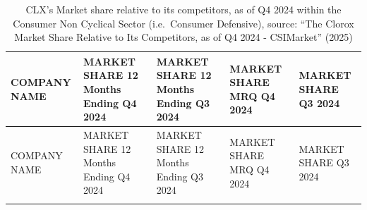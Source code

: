 \documentclass[
  letterpaper,
  DIV=11,
  numbers=noendperiod]{scrartcl}
\begin{document}
\begin{longtable}[]{@{}
  >{\raggedright\arraybackslash}p{}
  >{\raggedright\arraybackslash}p{}
  >{\raggedright\arraybackslash}p{}
  >{\raggedright\arraybackslash}p{}
  >{\raggedright\arraybackslash}p{}@{}}
\caption{CLX's Market share relative to its competitors, as of Q4 2024
within the Consumer Non Cyclical Sector (i.e.~Consumer Defensive),
source: {``The {Clorox Market} Share Relative to Its Competitors, as of
{Q4} 2024 - {CSIMarket}''} (2025)}\tabularnewline
\toprule\noalign{}
\begin{minipage}[b]{\linewidth}\raggedright
COMPANY NAME
\end{minipage} & \begin{minipage}[b]{\linewidth}\raggedright
MARKET SHARE 12 Months Ending Q4 2024
\end{minipage} & \begin{minipage}[b]{\linewidth}\raggedright
MARKET SHARE 12 Months Ending Q3 2024
\end{minipage} & \begin{minipage}[b]{\linewidth}\raggedright
MARKET SHARE MRQ Q4 2024
\end{minipage} & \begin{minipage}[b]{\linewidth}\raggedright
MARKET SHARE Q3 2024
\end{minipage} \\
\midrule\noalign{}
\endfirsthead
\toprule\noalign{}
\begin{minipage}[b]{\linewidth}\raggedright
COMPANY NAME
\end{minipage} & \begin{minipage}[b]{\linewidth}\raggedright
MARKET SHARE 12 Months Ending Q4 2024
\end{minipage} & \begin{minipage}[b]{\linewidth}\raggedright
MARKET SHARE 12 Months Ending Q3 2024
\end{minipage} & \begin{minipage}[b]{\linewidth}\raggedright
MARKET SHARE MRQ Q4 2024
\end{minipage} & \begin{minipage}[b]{\linewidth}\raggedright
MARKET SHARE Q3 2024
\end{minipage} \\
\midrule\noalign{}
\endhead
\bottomrule\noalign{}

\end{longtable}
\end{document}

